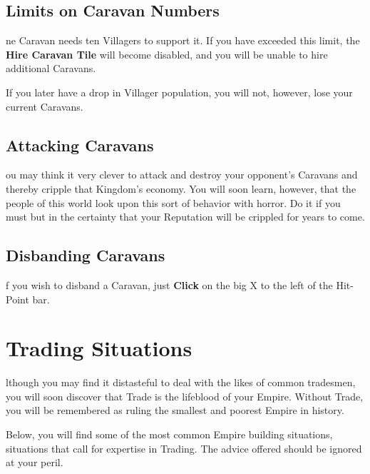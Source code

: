 \subsection{Limits on Caravan Numbers}


ne Caravan needs ten Villagers to support it. If you have exceeded this limit, the \textbf{Hire Caravan Tile} will become disabled, and you will be unable to hire additional Caravans.

If you later have a drop in Villager population, you will not, however, lose your current Caravans.

\subsection{Attacking Caravans}


ou may think it very clever to attack and destroy your opponent’s Caravans and thereby cripple that Kingdom's economy. You will soon learn, however, that the people of this world look upon this sort of behavior with horror. Do it if you must but in the certainty that your Reputation will be crippled for years to come.

\subsection{Disbanding Caravans}



f you wish to disband a Caravan, just \textbf{Click} on the big X to the left of the Hit-Point bar.

\section{Trading Situations}


lthough you may find it distasteful to deal with the likes of common tradesmen, you will soon discover that Trade is the lifeblood of your Empire. Without Trade, you will be remembered as ruling the smallest and poorest Empire in history.

Below, you will find some of the most common Empire building situations, situations that call for expertise in Trading. The advice offered should be ignored at your peril.

